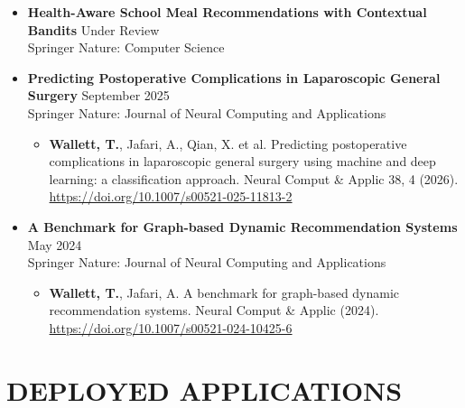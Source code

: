 \documentclass[a4paper,9pt]{extarticle}
\begin{document}
\begin{itemize}[leftmargin=0.5cm, label={}]
    \item \textbf{Health-Aware School Meal Recommendations with Contextual Bandits} \hfill Under Review \\ 
    Springer Nature: Computer Science 
\end{itemize}

\begin{itemize}[leftmargin=0.5cm, label={}]
    \item \textbf{Predicting Postoperative Complications in Laparoscopic General Surgery} \hfill September 2025 \\
    Springer Nature: Journal of Neural Computing and Applications
    \begin{itemize}
        \item[] \textbf{Wallett, T.}, Jafari, A., Qian, X. et al. Predicting postoperative complications in laparoscopic general surgery using machine and deep learning: a classification approach. Neural Comput \& Applic 38, 4 (2026). \href{https://doi.org/10.1007/s00521-025-11813-2}{https://doi.org/10.1007/s00521-025-11813-2}
    \end{itemize}
\end{itemize}

\begin{itemize}[leftmargin=0.5cm, label={}]
    \item \textbf{A Benchmark for Graph-based Dynamic Recommendation Systems} \hfill May 2024 \\ 
    Springer Nature: Journal of Neural Computing and Applications
    \begin{itemize}
        \item[] \textbf{Wallett, T.}, Jafari, A. A benchmark for graph-based dynamic recommendation systems. Neural Comput \& Applic (2024). \href{https://doi.org/10.1007/s00521-024-10425-6}{https://doi.org/10.1007/s00521-024-10425-6}
    \end{itemize}
\end{itemize}


\section*{DEPLOYED APPLICATIONS}
\end{document}
